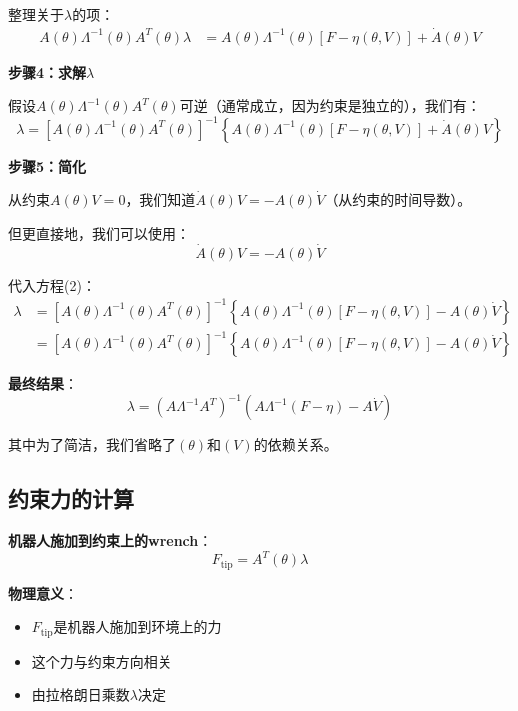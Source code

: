\documentclass[12pt,a4paper]{article}
\begin{document}
整理关于$\lambda$的项：
\begin{align}
A(\theta)\Lambda^{-1}(\theta)A^T(\theta)\lambda &= A(\theta)\Lambda^{-1}(\theta)[F - \eta(\theta, V)] + \dot{A}(\theta)V
\end{align}

\textbf{步骤4：求解$\lambda$}

假设$A(\theta)\Lambda^{-1}(\theta)A^T(\theta)$可逆（通常成立，因为约束是独立的），我们有：
\begin{equation}
\lambda = [A(\theta)\Lambda^{-1}(\theta)A^T(\theta)]^{-1}\left\{A(\theta)\Lambda^{-1}(\theta)[F - \eta(\theta, V)] + \dot{A}(\theta)V\right\} \tag{2}
\end{equation}

\textbf{步骤5：简化}

从约束$A(\theta)V = 0$，我们知道$\dot{A}(\theta)V = -A(\theta)\dot{V}$（从约束的时间导数）。

但更直接地，我们可以使用：
\begin{equation}
\dot{A}(\theta)V = -A(\theta)\dot{V}
\end{equation}

代入方程(2)：
\begin{align}
\lambda &= [A(\theta)\Lambda^{-1}(\theta)A^T(\theta)]^{-1}\left\{A(\theta)\Lambda^{-1}(\theta)[F - \eta(\theta, V)] - A(\theta)\dot{V}\right\} \\
        &= [A(\theta)\Lambda^{-1}(\theta)A^T(\theta)]^{-1}\left\{A(\theta)\Lambda^{-1}(\theta)[F - \eta(\theta, V)] - A(\theta)\dot{V}\right\}
\end{align}

\textbf{最终结果}：
\begin{equation}
\lambda = (A\Lambda^{-1}A^T)^{-1}(A\Lambda^{-1}(F - \eta) - A\dot{V}) \tag{11.58}
\end{equation}

其中为了简洁，我们省略了$(\theta)$和$(V)$的依赖关系。

\subsection{约束力的计算}

\textbf{机器人施加到约束上的wrench}：
\begin{equation}
F_{\text{tip}} = A^T(\theta)\lambda \tag{11.59}
\end{equation}

\textbf{物理意义}：
\begin{itemize}
\item $F_{\text{tip}}$是机器人施加到环境上的力
\item 这个力与约束方向相关
\item 由拉格朗日乘数$\lambda$决定
\end{itemize}
\end{document}
